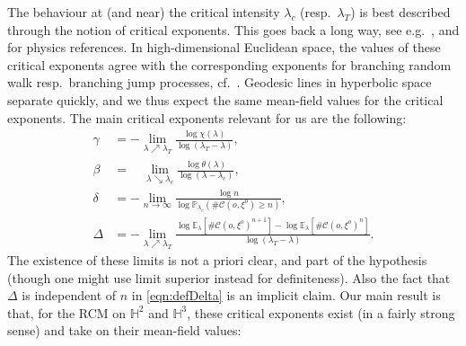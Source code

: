 \documentclass[10pt,a4paper,dvipsnames]{article}
\theoremstyle{definition}
\theoremstyle{remark}
\newcommand{\p}{\mathbb P}
\newcommand{\ela}{\mathbb E_{\lambda}}
\newcommand{\HypTwo}{{\mathbb{H}^2}}
\newcommand{\HypThree}{{\mathbb{H}^3}}
\newcommand{\C}{\mathscr {C}}
\newcommand{\orig}{o}
\numberwithin{equation}{section}
\begin{document}
The behaviour at (and near) the critical intensity $\lambda_c$ (resp.\ $\lambda_T$) is best described through the notion of critical exponents. This goes back a long way, see e.g.\ \cite{AizNew84,BarAiz91,Ngu87}, and \cite{hughes1996random} for physics references. In high-dimensional Euclidean space, the values of these critical exponents agree with the corresponding exponents for branching random walk resp.\ branching jump processes, cf.\ \cite[Section 1.2]{HeyHof17}. Geodesic lines in hyperbolic space separate quickly, and we thus expect the same mean-field values for the critical exponents. The main critical exponents relevant for us are the following: 
\begin{align}
    \gamma&=-\lim_{\lambda\nearrow\lambda_T}\frac{\log \chi(\lambda)}{\log(\lambda_T-\lambda)},\\
    \beta&=\quad\lim_{\lambda\searrow\lambda_c}\frac{\log \theta(\lambda)}{\log(\lambda-\lambda_c)},\\
    \delta&=-\lim_{n\to\infty}\frac{\log n}{\log\p_{\lambda_c}\left(\#\C\left(\orig,\xi^\orig\right)\geq n\right)},\\
    \Delta&=-\lim_{\lambda\nearrow\lambda_T}\frac{\log{\ela\left[\#\C\left(\orig,\xi^\orig\right)^{n+1}\right]}-\log{\ela\left[\#\C\left(\orig,\xi^\orig\right)^{n}\right]}}{\log(\lambda_T-\lambda)}.\label{eqn:defDelta}
\end{align}
The existence of these limits is not a priori clear, and part of the hypothesis (though one might use limit superior instead for definiteness). Also the fact that $\Delta$ is independent of $n$ in \eqref{eqn:defDelta} is an implicit claim. 
Our main result is that, for the RCM on $\HypTwo$ and $\HypThree$, these critical exponents exist (in a fairly strong sense) and take on their mean-field values: 
\end{document}
